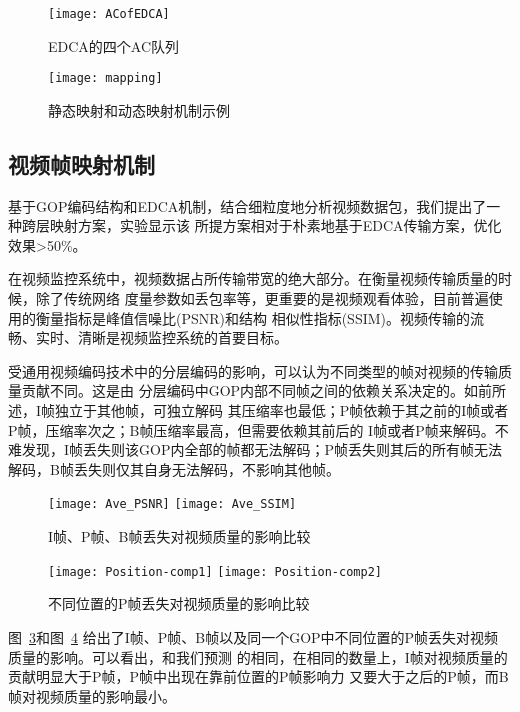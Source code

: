 \begin{figure}[H] %
  \centering
  \texttt{[image: ACofEDCA]}
  \caption{EDCA的四个AC队列}
  \label{fig:acofedca}
\end{figure}
\begin{figure}[H] %
  \centering
  \texttt{[image: mapping]}
  \caption{静态映射和动态映射机制示例}
  \label{fig:originmapping}
\end{figure}

\subsection{视频帧映射机制}
基于GOP编码结构和EDCA机制，结合细粒度地分析视频数据包，我们提出了一种跨层映射方案，实验显示该
所提方案相对于朴素地基于EDCA传输方案，优化效果>50\%。

在视频监控系统中，视频数据占所传输带宽的绝大部分。在衡量视频传输质量的时候，除了传统网络
度量参数如丢包率等，更重要的是视频观看体验，目前普遍使用的衡量指标是峰值信噪比(PSNR)和结构
相似性指标(SSIM)。视频传输的流畅、实时、清晰是视频监控系统的首要目标。

受通用视频编码技术中的分层编码的影响，可以认为不同类型的帧对视频的传输质量贡献不同。这是由
分层编码中GOP内部不同帧之间的依赖关系决定的。如前所述，I帧独立于其他帧，可独立解码
其压缩率也最低；P帧依赖于其之前的I帧或者P帧，压缩率次之；B帧压缩率最高，但需要依赖其前后的
I帧或者P帧来解码。不难发现，I帧丢失则该GOP内全部的帧都无法解码；P帧丢失则其后的所有帧无法
解码，B帧丢失则仅其自身无法解码，不影响其他帧。

\begin{figure}[h]
  \centering
  \subcaptionbox{}
      {\texttt{[image: Ave\_PSNR]}}
  \hspace{1em}
  \subcaptionbox{}
    {\texttt{[image: Ave\_SSIM]}}
  \caption{I帧、P帧、B帧丢失对视频质量的影响比较}
  \label{fig:ipb-comp}
\end{figure}

\begin{figure}[h]
  \centering
  \subcaptionbox{}
      {\texttt{[image: Position-comp1]}}
  \hspace{1em}
  \subcaptionbox{}
    {\texttt{[image: Position-comp2]}}
  \caption{不同位置的P帧丢失对视频质量的影响比较}
  \label{fig:position-comp}
\end{figure}

图~\ref{fig:ipb-comp}和图~\ref{fig:position-comp}
给出了I帧、P帧、B帧以及同一个GOP中不同位置的P帧丢失对视频质量的影响。可以看出，和我们预测
的相同，在相同的数量上，I帧对视频质量的贡献明显大于P帧，P帧中出现在靠前位置的P帧影响力
又要大于之后的P帧，而B帧对视频质量的影响最小。

